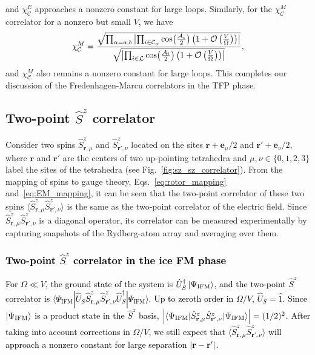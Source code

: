 \documentclass[twocolumn,superscriptaddress,amsmath,amssymb,aps,prx,nofootinbib]{revtex4-2}
\newcommand{\newtext}[1]{\textcolor{black}{#1}}
\begin{document}
{and $\chi_\mathcal{C}^E$ approaches a nonzero constant for large loops. Similarly, for the $\chi_\mathcal{C}^M$ correlator for a nonzero  but small $V$, we have
\begin{equation}
    \chi_\mathcal{C}^M = \frac{\sqrt{\prod_{\alpha=a,b}\abs{\prod_{i \in \mathcal{C}_\alpha} \cos(\frac{\mathcal{A}_i}{2}) \left(1+ \mathcal{O} \left(\frac{V}{\Omega} \right) \right) }  }}{\sqrt{\abs{\prod_{i \in \mathcal{L}} \cos(\frac{\mathcal{A}_i}{2})\left(1+ \mathcal{O} \left(\frac{V}{\Omega} \right) \right) } }}, 
\end{equation}
and $\chi_\mathcal{C}^M$ also remains a nonzero constant for large loops. This completes our discussion of the Fredenhagen-Marcu correlators in the TFP phase.}\\

\subsection{Two-point $\hat{S}^z$ correlator} \label{sec:sz_sz_correlator}

Consider  two spins $\hat{S}^z_{\mathbf{r},\mu}$ and $\hat{S}^z_{\mathbf{r}',\nu}$ located on the sites $\mathbf{r} + \mathbf{e}_\mu/2$ and $\mathbf{r}' + \mathbf{e}_\nu/2$, where $\mathbf{r}$ and $\mathbf{r}'$ are the centers of two up-pointing tetrahedra and $\mu, \nu \in \{ 0,1,2,3 \}$ label the sites of the tetrahedra (see Fig.~\ref{fig:sz_sz_correlator}). From the mapping of spins to gauge theory, Eqs.~\eqref{eq:rotor_mapping} and~\eqref{eq:EM_mapping}, it can be seen that the two-point  correlator of these two spins $\langle \hat{S}^z_{\mathbf{r},\mu} \hat{S}^z_{\mathbf{r}',\nu}\rangle $ is the same as the two-point correlator of the electric field. Since $\hat{S}^z_{\mathbf{r},\mu} \hat{S}^z_{\mathbf{r'},\nu} $ is a diagonal operator, its correlator can be measured experimentally by capturing snapshots of the Rydberg-atom array and averaging over them.

\newtext{\subsubsection{Two-point $\hat{S}^z$ correlator in the ice FM phase}}
\label{sec:sz_sz_corr_ice_fm}

\newtext{
For $\Omega \ll V$, the ground state of the system is $\hat{U}_S^\dagger \ket{\Psi_\text{IFM}}$, and the two-point $\hat{S}^z$ correlator is $\langle \Psi_\text{IFM} | \hat{U}_S \hat{S}^z_{\mathbf{r},\mu} \hat{S}^z_{\mathbf{r}',\nu} \hat{U}_S^\dagger | \Psi_\text{IFM} \rangle $. 
Up to zeroth order in $\Omega/V$, $\hat{U}_S =\hat{1}$. 
Since $\ket{\Psi_\text{IFM}}$ is a  product state in the $\hat{S}^z$ basis, $\abs{\langle \Psi_\text{IFM} | \hat{S}^z_{\mathbf{r},\mu} \hat{S}^z_{\mathbf{r}',\nu} | \Psi_\text{IFM} \rangle } = (1/2)^2$. After taking into account corrections in $\Omega/V$, we still expect that $\langle \hat{S}^z_{\mathbf{r},\mu} \hat{S}^z_{\mathbf{r}',\nu}\rangle $ will approach a nonzero constant for large separation $\abs{ \mathbf{r} - \mathbf{r}'} $. }
\end{document}
